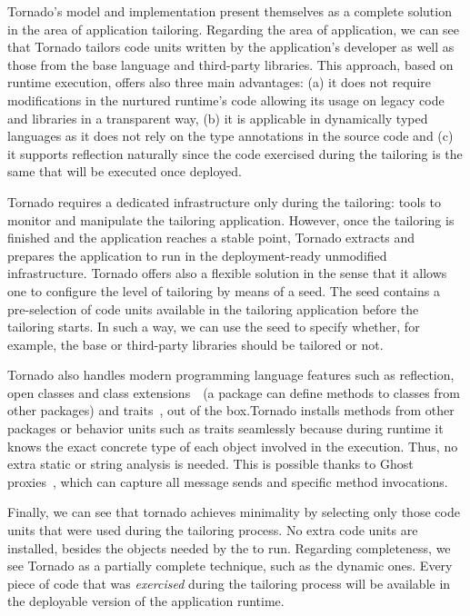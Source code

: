 Tornado's model and implementation present themselves as a complete solution in the area of application tailoring. Regarding the area of application, we can see that Tornado tailors code units written by the application's developer as well as those from the base language and third-party libraries. This approach, based on runtime execution, offers also three main advantages: (a) it does not require modifications in the nurtured runtime's code allowing its usage on legacy code and libraries in a transparent way, (b) it is applicable in dynamically typed languages as it does not rely on the type annotations in the source code and (c) it supports reflection naturally since the code exercised during the tailoring is the same that will be executed once deployed.

Tornado requires a dedicated infrastructure only during the tailoring: tools to monitor and manipulate the tailoring application. However, once the tailoring is finished and the application reaches a stable point, Tornado extracts and prepares the application to run in the deployment-ready unmodified infrastructure. Tornado offers also a flexible solution in the sense that it allows one to configure the level of tailoring by means of a seed. The seed contains a pre-selection of code units available in the tailoring application before the tailoring starts. In such a way, we can use the seed to specify whether, for example, the base or third-party libraries should be tailored or not.

Tornado also handles modern programming language features such as reflection, open classes and class extensions~\cite{Berg03a}~(\ie a package can define methods to classes from other packages) and traits~\cite{Scha03a}, out of the box.Tornado installs methods from other packages or behavior units such as traits seamlessly because during runtime it knows the exact concrete type of each object involved in the execution. Thus, no extra static or string analysis is needed. This is possible thanks to Ghost proxies~\cite{Mart11a}, which can capture all message sends and specific method invocations.

Finally, we can see that tornado achieves minimality by selecting only those code units that were used during the tailoring process. No extra code units are installed, besides the objects needed by the \VM to run. Regarding completeness, we see Tornado as a partially complete technique, such as the dynamic ones. Every piece of code that was \emph{exercised} during the tailoring process will be available in the deployable version of the application runtime.

